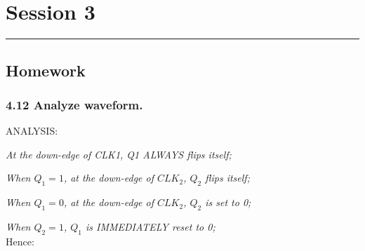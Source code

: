 \section{Session 3}
\vspace{-15pt}\noindent\rule{\textwidth}{0.1pt}\vspace{-10pt}
    \subsection{Homework}
    \subsubsection{4.12 \textnormal{Analyze waveform}.}
    {\color{hwSolution}
    \noindent ANALYSIS:

    \textit{At the down-edge of CLK1, Q1 ALWAYS flips itself;}

    \textit{When $Q_1 = 1$, at the down-edge of $CLK_2$, $Q_2$ flips itself;}

    \textit{When $Q_1 = 0$, at the down-edge of $CLK_2$, $Q_2$ is set to 0;}

    \textit{When $Q_2 = 1$, $Q_1$ is IMMEDIATELY reset to 0;}
    \\
    Hence:

}
